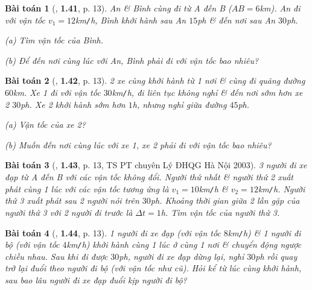 \documentclass{article}
\numberwithin{equation}{section}
\newtheorem{baitoan}{Bài toán}[section]
\begin{document}
\begin{baitoan}[\cite{Van2022}, \textbf{1.41}, p. 13]
	An \& Bình cùng đi từ A đến B ($AB = 6$\emph{km}). An đi với vận tốc $v_1 = 12$\emph{km\texttt{/}h}, Bình khởi hành sau An $15$\emph{ph} \& đến nơi sau An $30$\emph{ph}.
	\begin{enumerate*}
		\item[(a)] Tìm vận tốc của Bình.
		\item[(b)] Để đến nơi cùng lúc với An, Bình phải đi với vận tốc bao nhiêu?
	\end{enumerate*}
\end{baitoan}

\begin{baitoan}[\cite{Van2022}, \textbf{1.42}, p. 13]
	2 xe cùng khởi hành từ 1 nơi \& cùng đi quãng đường $60$\emph{km}. Xe 1 đi với vận tốc $30$\emph{km\texttt{/}h}, đi liên tục không nghỉ \& đến nơi sớm hơn xe 2 $30$\emph{ph}. Xe 2 khởi hành sớm hơn $1$\emph{h}, nhưng nghỉ giữa đường $45$\emph{ph}.
	\begin{enumerate*}
		\item[(a)] Vận tốc của xe 2?
		\item[(b)] Muốn đến nơi cùng lúc với xe 1, xe 2 phải đi với vận tốc bao nhiêu?
	\end{enumerate*}
\end{baitoan}

\begin{baitoan}[\cite{Van2022}, \textbf{1.43}, p. 13, TS PT chuyên Lý ĐHQG Hà Nội 2003]
	3 người đi xe đạp từ A đến B với các vận tốc không đổi. Người thứ nhất \& người thứ 2 xuất phát cùng 1 lúc với các vận tốc tương ứng là $v_1 = 10$\emph{km\texttt{/}h} \& $v_2 = 12$\emph{km\texttt{/}h}. Người thứ 3 xuất phát sau 2 người nói trên $30$\emph{ph}. Khoảng thời gian giữa 2 lần gặp của người thứ 3 với 2 người đi trước là $\Delta t = 1$\emph{h}. Tìm vận tốc của người thứ 3.
\end{baitoan}

\begin{baitoan}[\cite{Van2022}, \textbf{1.44}, p. 13]
	1 người đi xe đạp (với vận tốc $8$\emph{km\texttt{/}h}) \& 1 người đi bộ (với vận tốc $4$\emph{km\texttt{/}h}) khởi hành cùng 1 lúc ở cùng 1 nơi \& chuyển động ngược chiều nhau. Sau khi đi được $30$\emph{ph}, người đi xe đạp dừng lại, nghỉ $30$\emph{ph} rồi quay trở lại đuổi theo người đi bộ (với vận tốc như cũ). Hỏi kể từ lúc cùng khởi hành, sau bao lâu người đi xe đạp đuổi kịp người đi bộ?
\end{baitoan}
\end{document}
